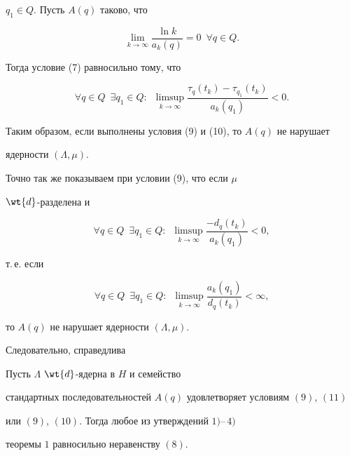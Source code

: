 $q_1\in Q$. Пусть $A(q)$ таково, что


\begin{equation}


\lim_{k\to\infty}\frac{\ln k}{a_k(q)}=0\ \; \forall q\in Q .


\end{equation}


Тогда условие (7) равносильно тому, что


\begin{equation}


\forall q\in Q\ \; \exists q_1\in Q:\ \;


\limsup_{k\to\infty}


\frac{\tau_q(t_k)-\tau_{q_1}(t_k)}{a_k(q_1)}<0.


\end{equation}


Таким образом, если выполнены условия (9) и (10), то $A(q)$ не нарушает


ядерности $(\Lambda,\mu)$.





Точно так же показываем при условии (9), что если $\mu$\;


$\wt{d}$-разделена и


$$


\forall q\in Q\ \; \exists q_1\in Q: \ \;


\limsup_{k\to\infty}


\frac{-d_q(t_k)}{a_k(q_1)}<0,


$$


т.\,е. если


\begin{equation}


\forall q\in Q\ \; \exists q_1\in Q:\ \;


\limsup_{k\to\infty} \frac{a_k(q_1)}{d_q(t_k)}<\infty,


\end{equation}


то $A(q)$ не нарушает ядерности $(\Lambda,\mu)$.


Следовательно, справедлива





\begin{thm}


Пусть $\Lambda$\; $\wt{d}$-ядерна в $H$ и семейство


стандартных последовательностей $A(q)$ удовлетворяет условиям $(9)$, $(11)$


или $(9)$, $(10)$. Тогда любое из утверждений $1)$--\,$4)$


теоремы $1$ равносильно неравенству $(8)$.


\end{thm}





